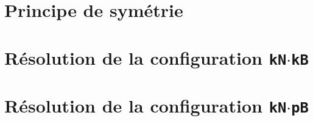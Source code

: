 \documentclass[12pt]{amsart}
\begin{document}
\section{Principe de symétrie}






\section{Résolution de la configuration \texttt{kN$\cdot$kB}}







\section{Résolution de la configuration \texttt{kN$\cdot$pB}}





%
%
%
%

%
%
%
%
%
%
%
%
%
%
\end{document}
